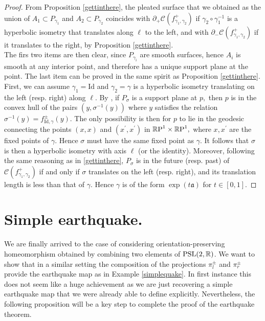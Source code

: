 \begin{proof}
    From Proposition \ref{gettinthere}, the pleated surface that we obtained as the union of $A_1\subset P_{\gamma_1}$ and $A_2\subset P_{\gamma_2}$ coincides with $\partial_+\mathcal{C}(f_{\gamma_1,\gamma_2}^+)$ if $\gamma_2\circ\gamma_1^{-1}$ is a hyperbolic isometry that translates along $\ell$ to the left, and with $\partial_-\mathcal{C}(f_{\gamma_1,\gamma_2}^+)$ if it translates to the right, by Proposition \ref{gettinthere}. \\
    The firs two items are then clear, since $P_{\gamma_i}$ are smooth surfaces, hence $A_i$ is smooth at any interior point, and therefore has a unique support plane at the point. The last item can be proved in the same spirit as Proposition \ref{gettinthere}. First, we can assume $\gamma_1=\text{Id}$ and $\gamma_2=\gamma$ is a hyperbolic isometry translating on the left (resp. right) along $\ell.$ By , if $P_\sigma$ is a support plane at $p,$ then $p$ is in the convex hull of the pairs $(y,\sigma^{-1}(y))$ where $y$ satisfies the relation $\sigma^{-1}(y)=f_{\text{Id},\gamma}^{\pm}(y).$ The only possibility is then for $p$ to lie in the geodesic connecting the points $(x,x)$ and $(x^{\prime},x^{\prime})$ in $\mathbb{R}\text{P}^1\times\mathbb{R}\text{P}^1,$ where $x,x^{\prime}$ are the fixed points of $\gamma$. Hence $\sigma$ must have the same fixed point as $\gamma$. It follows that $\sigma$ is then a hyperbolic isometry with axis $\ell$ (or the identity). Moreover, following the same reasoning as in \ref{gettinthere}, $P_\sigma$ is in the future (resp. past) of $\mathcal{C}(f_{\gamma_1,\gamma_2}^+)$ if and only if $\sigma$ translates on the left (resp. right), and its translation length is less than that of $\gamma.$ Hence $\gamma$ is of the form $\exp(t\mathfrak{a})$ for $t\in [0,1].$
\end{proof}

\section{Simple earthquake.}
We are finally arrived to the case of considering orientation-preserving homeomorphism obtained by combining two elements of $\text{PSL}(2,\mathbb{R})$. We want to show that in a similar setting the composition of the projections $\pi_l^{\pm}$ and $\pi_r^\pm$ provide the earthquake map as in Example \ref{simplequake}. In first instance this does not seem like a huge achievement as we are just recovering a simple earthquake map that we were already able to define explicitly. Nevertheless, the following proposition will be a key step to complete the proof of the earthquake theorem. 

